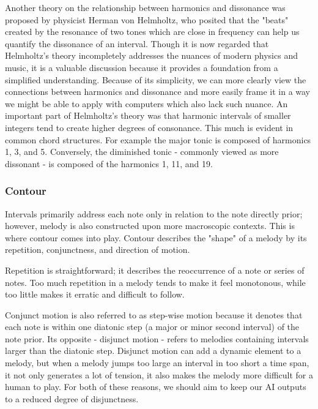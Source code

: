 Another theory on the relationship between harmonics and dissonance was proposed by physicist
Herman von Helmholtz, who posited that the "beats" created by the resonance of two tones which are
close in frequency can help us quantify the dissonance of an interval.\autocite{intervals} Though it is now regarded
that Helmholtz's theory incompletely addresses the nuances of modern physics and music, it is
a valuable discussion because it provides a foundation from a simplified understanding. Because
of its simplicity, we can more clearly view the connections between harmonics and dissonance and
more easily frame it in a way we might be able to apply with computers which also lack such nuance.
An important part of Helmholtz's theory was that harmonic intervals of smaller integers tend to
create higher degrees of consonance.\autocite{intervals} This much is evident in common chord
structures. For example the major tonic is composed of harmonics 1, 3, and 5. Conversely, the
diminished tonic - commonly viewed as more dissonant - is composed of the harmonics 1, 11, and 19.

\subsubsection{Contour}

Intervals primarily address each note only in relation to the note directly prior; however, melody
is also constructed upon more macroscopic contexts. This is where contour comes into play. Contour
describes the "shape" of a melody by its repetition, conjunctness, and direction of motion.\autocite{contour}

Repetition is straightforward; it describes the reoccurrence of a note or series of notes. Too much
repetition in a melody tends to make it feel monotonous, while too little makes it erratic and
difficult to follow.\autocite{contour}

Conjunct motion is also referred to as step-wise motion because it denotes that each note is within
one diatonic step (a major or minor second interval) of the note prior. Its opposite - disjunct
motion - refers to melodies containing intervals larger than the diatonic step. Disjunct motion can
add a dynamic element to a melody, but when a melody jumps too large an interval in too short a
time span, it not only generates a lot of tension, it also makes the melody more difficult for a
human to play. For both of these reasons, we should aim to keep our AI outputs to a reduced degree
of disjunctness.\autocite{contour}

